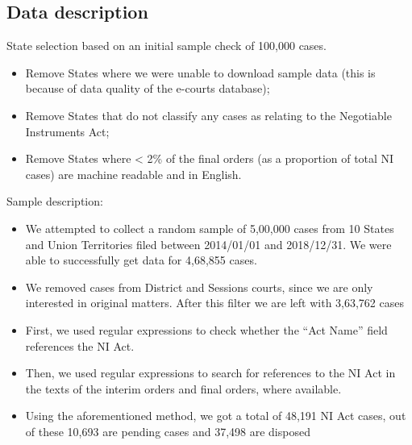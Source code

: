 \subsection{Data description}
\label{sec:data-description}
State selection based on an initial sample check of 100,000 cases.
\begin{itemize}
\item Remove States where we were unable to download sample data (this is because of data quality of the e-courts database);
\item Remove States that do not classify any cases as relating to the Negotiable Instruments Act;
\item Remove States where < 2\% of the final orders (as a proportion of total NI cases) are machine readable and in English.
\end{itemize}

Sample description:
\begin{itemize}
\item We attempted to collect a random sample of 5,00,000 cases from
  10 States and Union Territories filed between 2014/01/01 and
  2018/12/31. We were able to successfully get data for 4,68,855
  cases.
\item We removed cases from District and Sessions courts, since we are
  only interested in original matters. After this filter we are left
  with 3,63,762 cases
\item First, we used regular expressions to check whether the ``Act
  Name'' field references the NI Act.
\item Then, we used regular expressions to search for references to
  the NI Act in the texts of the interim orders and final orders,
  where available.
\item Using the aforementioned method, we got a total of 48,191 NI Act
  cases, out of these 10,693 are pending cases and 37,498 are disposed
\end{itemize}

